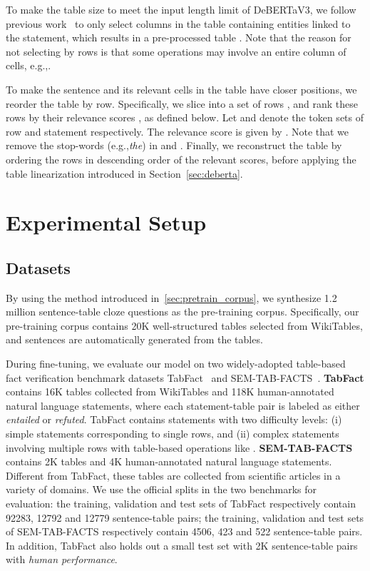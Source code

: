 \documentclass[11pt]{article}
\newcommand{\eg}{{e.g.,}\xspace}
\newcommand{\stitle}[1]{\vspace{1mm}\noindent{\bf #1}}
\newcommand{\term}[1]{\xspace}
\begin{document}
\stitle{Column-wise Selection.} To make the table size to meet the input length limit of DeBERTaV3, we follow previous work~\cite{tabfact} to only select columns in the table containing entities linked to the statement, which results in a pre-processed table . Note that the reason for not selecting by rows is that some operations may involve an entire column of cells, \eg \term{Aggregation}.

\stitle{Row-wise Ranking.} To make the sentence and its relevant cells in the table have closer positions, we reorder the table  by row. Specifically, we slice  into a set of rows , and rank these rows by their relevance scores , as defined below. Let  and  denote the token sets of row  and statement  respectively. The relevance score  is given by . Note that we remove the stop-words (\eg \emph{the}) in  and . Finally, we reconstruct the table by ordering the rows in descending order of the relevant scores, before applying 
the table linearization introduced in Section~\ref{sec:deberta}.

%
 \section{Experimental Setup} \label{sec:exp-setup}

\subsection{Datasets}
By using the method introduced in~\ref{sec:pretrain_corpus}, we synthesize 1.2 million sentence-table cloze questions as the pre-training corpus. Specifically, our pre-training corpus contains 20K well-structured tables selected from WikiTables, and sentences are automatically generated from the tables. 

During fine-tuning, we evaluate our model on two widely-adopted table-based fact verification benchmark datasets TabFact~\cite{tabfact} and SEM-TAB-FACTS~\cite{semtabfact}.
\textbf{TabFact} contains 16K tables collected from WikiTables and 118K human-annotated natural language statements, where each statement-table pair is labeled as either \emph{entailed} or \emph{refuted}. TabFact contains statements with two difficulty levels: (i) simple statements corresponding to single rows, and (ii) complex statements involving  multiple rows with table-based operations like \term{Aggregation}. 
\textbf{SEM-TAB-FACTS} contains 2K tables and 4K human-annotated natural language statements. Different from TabFact, these tables are collected from scientific articles in a variety of domains. 
We use the official splits in the two benchmarks for evaluation: the training, validation and test sets of TabFact respectively contain 92283, 12792 and 12779 sentence-table pairs; the training, validation and test sets of SEM-TAB-FACTS respectively contain 4506, 423 and 522 sentence-table pairs. In addition, TabFact also holds out a small test set with 2K sentence-table pairs with \emph{human performance}. 
\end{document}
